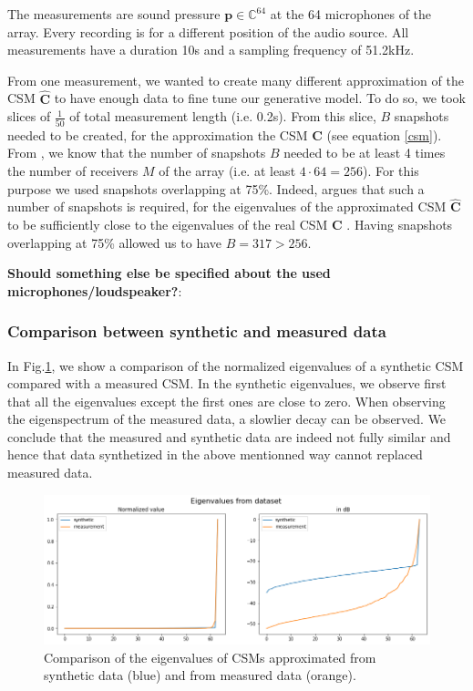 \documentclass{article}
\begin{document}
The measurements are sound pressure $\mathbf{p} \in \mathbb{C}^{64}$ at the 64 microphones of the array. Every recording is for a different position of the audio source. All measurements have a duration 10s and a sampling frequency of 51.2kHz.

From one measurement, we wanted to create many different approximation of the CSM $\hat{\mathbf{C}}$ to have enough data to fine tune our generative model. To do so, we took slices of $\frac{1}{50}$ of total measurement length (i.e. 0.2s). From this slice, $B$ snapshots needed to be created, for the approximation the CSM $\hat{\mathbf{C}}$ (see equation \ref{csm}). From \cite{gerstoft2012eigenvalues}, we know that the number of snapshots $B$ needed to be at least 4 times the number of receivers $M$ of the array (i.e. at least $4 \cdot 64 = 256$). For this purpose we used snapshots overlapping at 75\%. Indeed, \cite{gerstoft2012eigenvalues} argues that such a number of snapshots is required, for the eigenvalues of the approximated CSM $\hat{\mathbf{C}}$ to be sufficiently close to the eigenvalues of the real CSM $\mathbf{C}$ . Having snapshots overlapping at 75\% allowed us to have $B = 317 >  256$.

\textbf{Should something else be specified about the used microphones/loudspeaker?}: 



\subsubsection{Comparison between synthetic and measured data}

In Fig.\ref{fig:data_eigenvalue_spectrum}, we show a comparison of the normalized eigenvalues of a synthetic CSM compared with a measured CSM. In the synthetic eigenvalues, we observe first that all the eigenvalues except the first ones are close to zero. When observing the eigenspectrum of the measured data, a slowlier decay can be observed. We conclude that the measured and synthetic data are indeed not fully similar and hence that data synthetized in the above mentionned way cannot replaced measured data.

\begin{figure}
    \centering
    \includegraphics[width=\textwidth]{../figs/data_eigenvalue_spectrum.png}
    \caption{Comparison of the eigenvalues of CSMs approximated from synthetic data (blue) and from measured data (orange).}
    \label{fig:data_eigenvalue_spectrum}
\end{figure}
\end{document}
